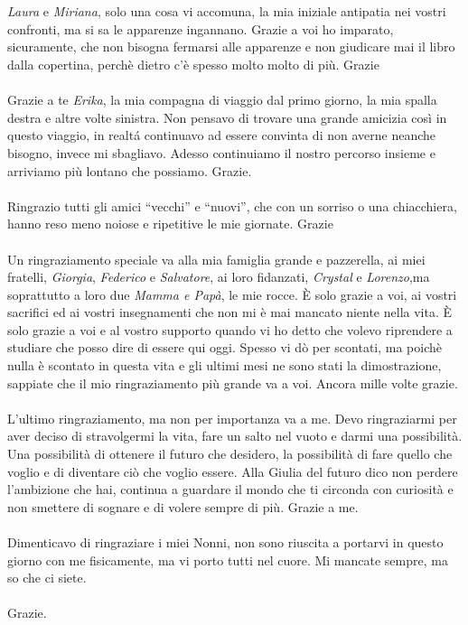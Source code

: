 \\
\\
\textit{Laura} e \textit{Miriana}, solo una cosa vi accomuna, la mia iniziale antipatia nei vostri confronti, ma si sa le apparenze ingannano.
Grazie a voi ho imparato, sicuramente, che non bisogna fermarsi alle apparenze e non giudicare mai il libro dalla copertina, perch\`e dietro c'\`e spesso molto molto di pi\`u. Grazie
\\
\\
Grazie a te \textit{Erika}, la mia compagna di viaggio dal primo giorno, la mia spalla destra e altre volte sinistra.
Non pensavo di trovare una grande amicizia cos\`i in questo viaggio, in realt\'a continuavo ad essere convinta di non averne neanche bisogno, invece mi sbagliavo.
Adesso continuiamo il nostro percorso insieme e arriviamo pi\`u lontano che possiamo. Grazie.
\\
\\
Ringrazio tutti gli amici ``vecchi'' e ``nuovi'', che con un sorriso o una chiacchiera, hanno reso meno noiose e ripetitive le mie giornate.
Grazie
\\
\\
Un ringraziamento speciale va alla mia famiglia grande e pazzerella, ai miei fratelli, \textit{Giorgia}, \textit{Federico} e \textit{Salvatore}, ai loro fidanzati, \textit{Crystal} e \textit{Lorenzo},ma soprattutto a loro due \textit{Mamma e Pap\`a}, le mie rocce.
\`E solo grazie a voi, ai vostri sacrifici ed ai vostri insegnamenti che non mi \`e mai mancato niente nella vita.
\`E solo grazie a voi e al vostro supporto quando vi ho detto che volevo riprendere a studiare che posso dire di essere qui oggi.
Spesso vi d\`o per scontati, ma poich\`e nulla \`e scontato in questa vita e gli ultimi mesi ne sono stati la dimostrazione, sappiate che il mio ringraziamento pi\`u grande va a voi. Ancora mille volte grazie.
\\
\\
L'ultimo ringraziamento, ma non per importanza va a me.
Devo ringraziarmi per aver deciso di stravolgermi la vita, fare un salto nel vuoto e darmi una possibilit\`a.
Una possibilit\`a di ottenere il futuro che desidero, la possibilit\`a di fare quello che voglio e di diventare ci\`o che voglio essere.
Alla Giulia del futuro dico non perdere l'ambizione che hai, continua a guardare il mondo che ti circonda con curiosit\`a e non smettere di sognare e di volere sempre di pi\`u. Grazie a me.
\\
\\
Dimenticavo di ringraziare i miei Nonni, non sono riuscita a portarvi in questo giorno con me fisicamente, ma vi porto tutti nel cuore. Mi mancate sempre, ma so che ci siete. 
\\  
\\
Grazie.

